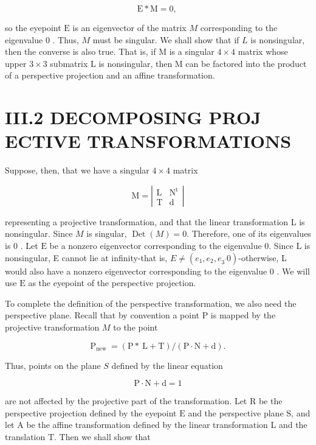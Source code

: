 $$
\mathrm{E} * \mathrm{M}=0 \text {, }
$$

so the eyepoint $\mathrm{E}$ is an eigenvector of the matrix $M$ corresponding to the eigenvalue 0 . Thus, $M$ must be singular. We shall show that if $L$ is nonsingular, then the converse is also true. That is, if $\mathrm{M}$ is a singular $4 \times 4$ matrix whose upper $3 \times 3$ submatrix L is nonsingular, then M can be factored into the product of a perspective projection and an affine transformation.

\section{III.2 DECOMPOSING PROJ ECTIVE TRANSFORMATIONS}
Suppose, then, that we have a singular $4 \times 4$ matrix

$$
\mathrm{M}=\left|\begin{array}{cc}
\mathrm{L} & \mathrm{N}^{\mathrm{t}} \\
\mathrm{T} & \mathrm{d}
\end{array}\right|
$$

representing a projective transformation, and that the linear transformation L is nonsingular. Since $M$ is singular, $\operatorname{Det}(M)=0$. Therefore, one of its eigenvalues is 0 . Let $\mathrm{E}$ be a nonzero eigenvector corresponding to the eigenvalue 0. Since L is nonsingular, E cannot lie at infinity-that is, $E \neq\left(e_{1}, e_{2}, e_{3^{\prime}} 0\right)$-otherwise, L would also have a nonzero eigenvector corresponding to the eigenvalue 0 . We will use $\mathrm{E}$ as the eyepoint of the perspective projection.

To complete the definition of the perspective transformation, we also need the perspective plane. Recall that by convention a point $\mathrm{P}$ is mapped by the projective transformation $M$ to the point

$$
\mathrm{P}_{\text {new }}=(\mathrm{P} * \mathrm{~L}+\mathrm{T}) /(\mathrm{P} \cdot \mathrm{N}+\mathrm{d}) .
$$

Thus, points on the plane $S$ defined by the linear equation

$$
\mathrm{P} \cdot \mathrm{N}+\mathrm{d}=1
$$

are not affected by the projective part of the transformation. Let $\mathrm{R}$ be the perspective projection defined by the eyepoint $\mathrm{E}$ and the perspective plane $\mathrm{S}$, and let $\mathrm{A}$ be the affine transformation defined by the linear transformation L and the translation T. Then we shall show that

